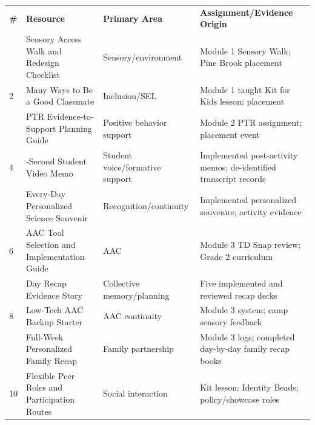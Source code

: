 \documentclass[11pt]{article}
\begin{document}
\small
\setlength{\tabcolsep}{4pt}
\begin{longtable}{>{\centering\arraybackslash}p{0.35in} >{\RaggedRight\arraybackslash}p{2.40in} >{\RaggedRight\arraybackslash}p{1.35in} >{\RaggedRight\arraybackslash}p{2.65in}}
\rowcolor{PrimaryRed}
\color{white}\bfseries \# & \color{white}\bfseries Resource & \color{white}\bfseries Primary Area & \color{white}\bfseries Assignment/Evidence Origin \\
1 & Sensory Access Walk and Redesign Checklist & Sensory/environment & Module 1 Sensory Walk; Pine Brook placement \\
\rowcolor{SoftGray}
2 & Many Ways to Be a Good Classmate & Inclusion/SEL & Module 1 taught Kit for Kids lesson; placement \\
3 & PTR Evidence-to-Support Planning Guide & Positive behavior support & Module 2 PTR assignment; placement event \\
\rowcolor{SoftGray}
4 & 30-Second Student Video Memo & Student voice/formative support & Implemented post-activity memos; de-identified transcript records \\
5 & Every-Day Personalized Science Souvenir & Recognition/continuity & Implemented personalized souvenirs; activity evidence \\
\rowcolor{SoftGray}
6 & AAC Tool Selection and Implementation Guide & AAC & Module 3 TD Snap review; Grade 2 curriculum \\
7 & Day Recap Evidence Story & Collective memory/planning & Five implemented and reviewed recap decks \\
\rowcolor{SoftGray}
8 & Low-Tech AAC Backup Starter & AAC continuity & Module 3 system; camp sensory feedback \\
9 & Full-Week Personalized Family Recap & Family partnership & Module 3 logs; completed day-by-day family recap books \\
\rowcolor{SoftGray}
10 & Flexible Peer Roles and Participation Routes & Social interaction & Kit lesson; Identity Beads; policy/showcase roles \\
\end{longtable}
\normalsize











\end{document}
